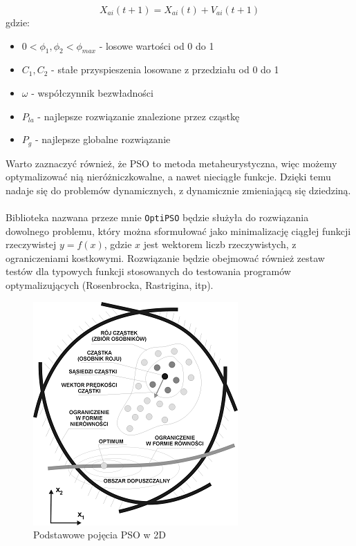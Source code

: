 \documentclass[a4paper,14pt,titlepage]{article}
\newcommand{\prog}{\texttt}
\begin{document}
\begin{equation}
X_{ai}(t+1)=X_{ai}(t)+V_{ai}(t+1)
\end{equation}
gdzie:
\begin{itemize}
\item $ 0<\phi_1,\phi_2 < \phi_{max}$ - losowe wartości od 0 do 1
\item $C_1, C_2$ - stałe przyspieszenia losowane z przedziału od 0 do 1
\item $\omega$ - współczynnik bezwładności
\item $P_{la}$ - najlepsze rozwiązanie znalezione przez cząstkę
\item $P_g$ - najlepsze globalne rozwiązanie
\end{itemize}
Warto zaznaczyć również, że PSO to metoda metaheurystyczna, więc możemy optymalizować nią nieróżniczkowalne, a nawet nieciągłe funkcje. Dzięki temu nadaje się do problemów dynamicznych, z dynamicznie zmieniającą się dziedziną.
\\\\
Biblioteka nazwana przeze mnie \prog{OptiPSO} będzie służyła do rozwiązania dowolnego problemu, który można sformułować jako minimalizację ciągłej funkcji rzeczywistej $y=f(x)$, gdzie $x$ jest wektorem liczb rzeczywistych, z ograniczeniami kostkowymi. Rozwiązanie będzie obejmować również zestaw testów dla typowych funkcji stosowanych do testowania programów optymalizujących (Rosenbrocka, Rastrigina, itp).

\begin{figure}
  \begin{center}
      \includegraphics[width=.50\textwidth]{fig1.PNG}
    \caption{Podstawowe pojęcia PSO w 2D}
  \end{center}
\end{figure}
\end{document}
